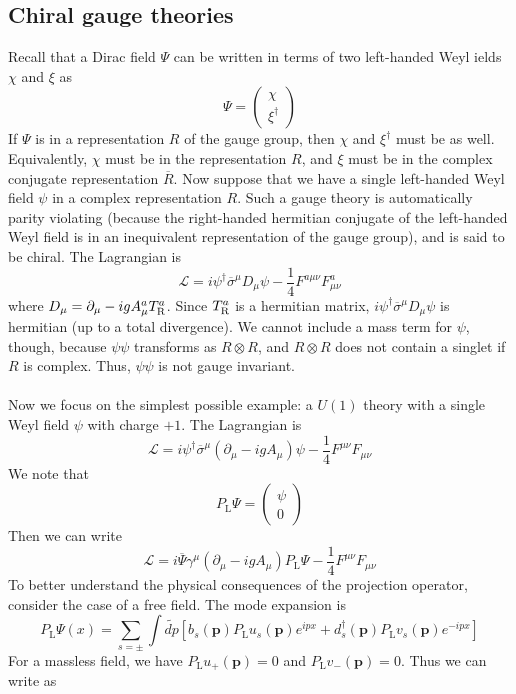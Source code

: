 \subsection{Chiral gauge theories}
Recall that a Dirac field $\Psi$ can be written in terms of two left-handed Weyl ields $\chi$ and $\xi$ as
\[\Psi = \begin{pmatrix}\chi\\ \xi^{\dagger} \end{pmatrix}\] If $\Psi$ is in a representation $R$ of the gauge group, then $\chi$ and $\xi^{\dagger}$ must be as well. Equivalently, $\chi$ must be in the representation $R$, and $\xi$ must be in the complex conjugate representation $\overline{R}$.
Now suppose that we have a single left-handed Weyl field $\psi$ in a complex representation $R$. Such a gauge theory is automatically parity violating (because the right-handed hermitian conjugate of the left-handed Weyl field is in an inequivalent representation of the gauge group), and is said to be chiral.
The Lagrangian is
\[\mathcal{L} = i\psi^{\dagger} \overline{\sigma}^{\mu} D_{\mu} \psi - \frac{1}{4}F^{a\mu\nu}F^a_{\mu\nu}\]
where $D_{\mu} = \partial_{\mu} - igA^{a}_{\mu} T^a_{\rm R}$.
Since $T^a_{\rm R}$ is a hermitian matrix, $i\psi^{\dagger} \overline{\sigma}^{\mu} D_{\mu} \psi$ is hermitian (up to a total divergence). We cannot include a mass term for $\psi$, though, because $\psi\psi$ transforms as $R \otimes R$, and $R \otimes R$ does not contain a singlet if $R$ is complex. Thus, $\psi\psi$ is not gauge invariant. 
\\ \\
Now we focus on the simplest possible example: a $U(1)$ theory with a single Weyl field $\psi$ with charge $+1$. The Lagrangian is
\[\mathcal{L} = i\psi^{\dagger} \overline{\sigma}^{\mu} (\partial_{\mu} - igA_{\mu}) \psi - \frac{1}{4}F^{\mu\nu}F_{\mu\nu}\]
We note that
\[P_{\mathrm{L}} \Psi = \begin{pmatrix}
\psi \\ 0
\end{pmatrix}\]
Then we can write
\[\mathcal{L} = i\overline{\Psi} \gamma^{\mu} (\partial_{\mu} - igA_{\mu}) P_{\mathrm{L}}\Psi - \frac{1}{4}F^{\mu\nu}F_{\mu\nu}\]
To better understand the physical consequences of the projection operator, consider the case of a free field. The mode expansion is
\[P_{\mathrm{L}}\Psi(x) = \sum_{s = \pm} \int \tilde{dp} [b_s(\bm{p})P_{\mathrm{L}}u_s(\bm{p})e^{ipx} + d_s^{\dagger}(\bm{p})P_{\mathrm{L}} v_s(\bm{p}) e^{-ipx}]\]
For a massless field, we have $P_{\mathrm{L}} u_{+}(\bm{p}) = 0$ and $P_{\mathrm{L}} v_-(\bm{p}) = 0$. Thus we can write as
